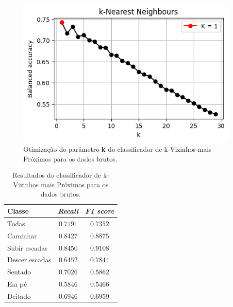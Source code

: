 \documentclass[final,5p]{elsarticle}
\numberwithin{equation}{section}
\begin{document}
        \begin{figure}[hbt!]
            \includegraphics[width=0.95\columnwidth]{B_kNN_bestK.png}
            \caption{Otimização do parâmetro \textbf{k} do classificador de k-Vizinhos mais Próximos para os dados brutos.}
            \label{fig:knn_melhor_k_brutos}
        \end{figure}

        \begin{table}[h]
            \centering
            \begin{tabular}{l c c}
                \toprule
                \textbf{Classe} & \textbf{\emph{Recall}}  & \textbf{\emph{F1 score}} \\
                \midrule
                Todas & $0.7191$ & $0.7352$ \\
                \addlinespace
                Caminhar   & $0.8427$ & $0.8875$ \\
                Subir escadas   & $0.8450$ & $0.9108$ \\
                Descer escadas & $0.6452$ & $0.7844$ \\
                Sentado   & $0.7026$ & $0.5862$ \\
                Em pé  & $0.5846$ & $0.5466$ \\
                Deitado    & $0.6946$ & $0.6959$ \\
                \bottomrule
            \end{tabular}
            \caption{Resultados do classificador de k-Vizinhos mais Próximos para os dados brutos.}
            \label{tab:resultados_knn_vanilla_brutos}
        \end{table}
\end{document}
